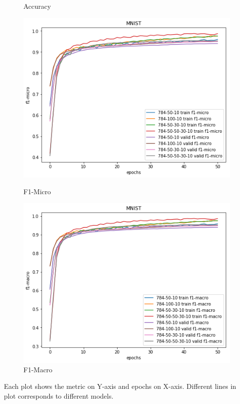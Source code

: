 \documentclass{article}
\begin{document}
\begin{figure}[!htb]
	\caption{Accuracy}\label{fig:part_1_task_2_accuracy}
	\endminipage\hfill
	\includegraphics[width=\linewidth]{../output_plots/part_1_task_2_f1-micro.png}
	\caption{F1-Micro}\label{fig:part_1_task_2_f1-micro}
	\endminipage
	\includegraphics[width=\linewidth]{../output_plots/part_1_task_2_f1-macro.png}
	\caption{F1-Macro}\label{fig:part_1_task_2_f1-macro}
	\endminipage
\end{figure}

Each plot shows the metric on Y-axis and epochs on X-axis. Different lines in plot corresponds to different models.

\pagebreak
\end{document}
